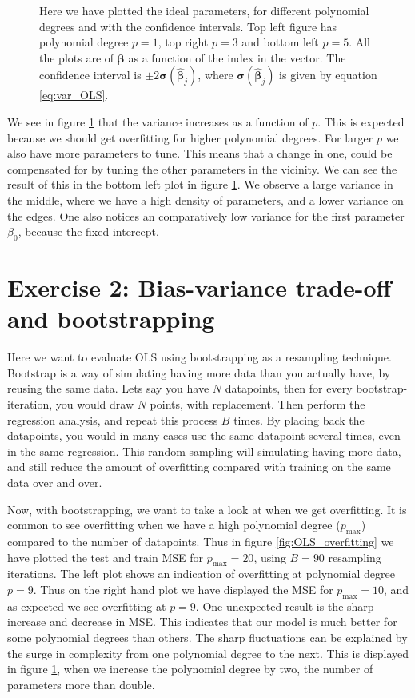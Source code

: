 \documentclass[reprint,english,notitlepage,aps,nobalancelastpage,nofootinbib]{revtex4-1}  %
\begin{document}
\begin{figure}[H]
	\endminipage\hfill
	\caption{Here we have plotted the ideal parameters, for different polynomial degrees and with the confidence intervals. Top left figure has polynomial degree $p = 1$, top right $p = 3$ and bottom left $p = 5$. All the plots are of $\boldsymbol{\beta}$ as a function of the index in the vector. The confidence interval is $\pm 2\boldsymbol{\sigma}(\boldsymbol{\hat{\beta}}_{j})$, where $\boldsymbol{\sigma}(\boldsymbol{\hat{\beta}}_{j})$ is given by equation \eqref{eq:var_OLS}.} \label{fig:var_beta}
	\endminipage
\end{figure}
We see in figure \ref{fig:var_beta} that the variance increases as a function of $p$. This is expected because we should get overfitting for higher polynomial degrees. For larger $p$ we also have more parameters to tune. This means that a change in one, could be compensated for by tuning the other parameters in the vicinity. We can see the result of this in the bottom left plot in figure \ref{fig:var_beta}. We observe a large variance in the middle, where we have a high density of parameters, and a lower variance on the edges. One also notices an comparatively low variance for the first parameter $\beta_0$, because the fixed intercept.


\section*{Exercise 2: Bias-variance trade-off and bootstrapping}

Here we want to evaluate OLS using bootstrapping as a resampling technique. Bootstrap is a way of simulating having more data than you actually have, by reusing the same data. Lets say you have $N$ datapoints, then for every bootstrap-iteration, you would draw $N$ points, with replacement. Then perform the regression analysis, and repeat this process $B$ times. By placing back the datapoints, you would in many cases use the same datapoint several times, even in the same regression. This random sampling will simulating having more data, and still reduce the amount of overfitting compared with training on the same data over and over.

Now, with bootstrapping, we want to take a look at when we get overfitting. It is common to see overfitting when we have a high polynomial degree ($p_\text{max}$) compared to the number of datapoints. Thus in figure \ref{fig:OLS_overfitting} we have plotted the test and train MSE for $p_\text{max} = 20$, using $B=90$ resampling iterations. The left plot shows an indication of overfitting at polynomial degree $p = 9$. Thus on the right hand plot we have displayed the MSE for $p_\text{max} = 10$, and as expected we see overfitting at $p=9$. One unexpected result is the sharp increase and decrease in MSE. This indicates that our model is much better for some polynomial degrees than others. The sharp fluctuations can be explained by the surge in complexity from one polynomial degree to the next. This is displayed in figure \ref{fig:var_beta}, when we increase the polynomial degree by two, the number of parameters more than double.
\end{document}
